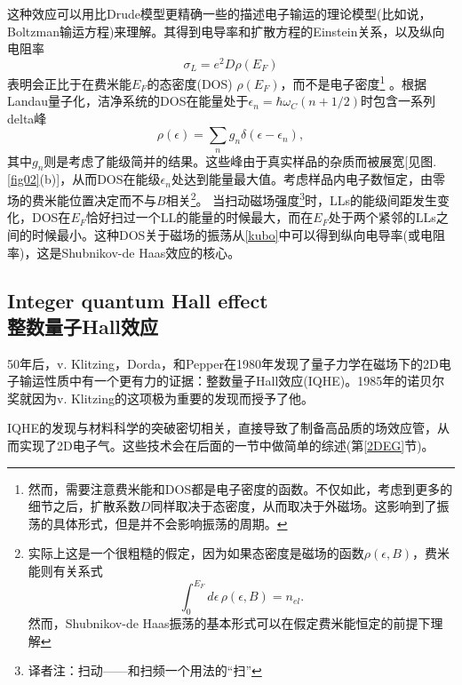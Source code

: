 \documentclass[10pt]{book}
\newcommand{\beq}{\begin{equation}}
\newcommand{\eeq}{\end{equation}}
\begin{document}
这种效应可以用比Drude模型更精确一些的描述电子输运的理论模型(比如说，Boltzman输运方程)来理解。其得到电导率和扩散方程的Einstein关系，以及纵向电阻率
\beq\label{kubo}
\sigma_L=e^2 D \rho(E_F)
\eeq 
表明会正比于在费米能$E_F$的态密度(DOS) $\rho(E_F)$，而不是电子密度\footnote{然而，需要注意费米能和DOS都是电子密度的函数。不仅如此，考虑到更多的细节之后，扩散系数$D$同样取决于态密度，从而取决于外磁场。这影响到了振荡的具体形式，但是并不会影响振荡的周期。} 。根据Landau量子化，洁净系统的DOS在能量处于$\epsilon_n=\hbar \omega_C(n+1/2)$时包含一系列delta峰
\[\rho(\epsilon)=\sum_n g_n \delta(\epsilon-\epsilon_n), \]
其中$g_n$则是考虑了能级简并的结果。这些峰由于真实样品的杂质而被展宽[见图. \ref{fig02}(b)]，从而DOS在能级$\epsilon_n$处达到能量最大值。考虑样品内电子数恒定，由零场的费米能位置决定而不与$B$相关\footnote{实际上这是一个很粗糙的假定，因为如果态密度是磁场的函数$\rho(\epsilon,B)$，费米能则有关系式
\[\int_0^{E_F}d\epsilon\,\rho(\epsilon,B)=n_{el}. \]
然而，Shubnikov-de Haas振荡的基本形式可以在假定费米能恒定的前提下理解}。
\renewcommand*{\thefootnote}{\fnsymbol{footnote}}
当扫动磁场强度\footnote[2]{译者注：扫动——和扫频一个用法的``扫''}时，LLs的能级间距发生变化，DOS在$E_F$恰好扫过一个LL的能量的时候最大，而在$E_F$处于两个紧邻的LLs之间的时候最小。这种DOS关于磁场的振荡从\eqref{kubo}中可以得到纵向电导率(或电阻率)，这是Shubnikov-de Haas效应的核心。
\renewcommand*{\thefootnote}{\arabic{footnote}}


\subsection[整数量子Hall效应]{Integer quantum Hall effect\\\bf 整数量子Hall效应}

50年后，v. Klitzing，Dorda，和Pepper在1980年发现了量子力学在磁场下的2D电子输运性质中有一个更有力的证据：整数量子Hall效应(IQHE)\cite{KDP}。1985年的诺贝尔奖就因为v. Klitzing的这项极为重要的发现而授予了他。

IQHE的发现与材料科学的突破密切相关，直接导致了制备高品质的场效应管，从而实现了2D电子气。这些技术会在后面的一节中做简单的综述(第\ref{2DEG}节)。
\end{document}
